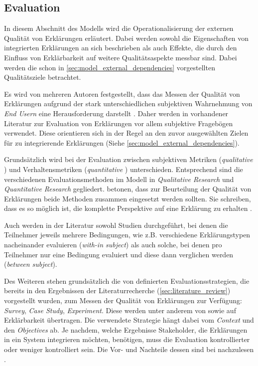 \subsection{Evaluation}
\label{sec:model_evaluation_description}

In diesem Abschnitt des Modells wird die Operationalisierung der externen Qualität von Erklärungen erläutert. Dabei werden sowohl die Eigenschaften von integrierten Erklärungen an sich beschrieben als auch Effekte, die durch den Einfluss von Erklärbarkeit auf weitere Qualitätsaspekte messbar sind. Dabei werden die schon in \autoref{sec:model_external_dependencies} vorgestellten Qualitätsziele betrachtet.

Es wird von mehreren Autoren festgestellt, dass das Messen der Qualität von Erklärungen aufgrund der stark unterschiedlichen subjektiven Wahrnehmung von \textit{End Usern}  eine Herausforderung darstellt \cite{nunes_systematic_2017, eiband_impact_2019, kouki_user_2017}. Daher werden in vorhandener Literatur zur Evaluation von Erklärungen vor allem subjektive Fragebögen verwendet. Diese orientieren sich in der Regel an den zuvor ausgewählten Zielen für zu integrierende Erklärungen (Siehe \autoref{sec:model_external_dependencies}).

Grundsätzlich wird bei der Evaluation zwischen subjektiven Metriken (\textit{qualitative} \citeauthor{wohlin2012experimentation}) und Verhaltensmetriken (\textit{quantitative} \cite{wohlin2012experimentation}) unterschieden. Entsprechend sind die verschiedenen Evaluationsmethoden im Modell in \textit{Qualitative Research} und \textit{Quantitative Research} gegliedert. \citeauthor{waa_evaluating_2021} betonen, dass zur Beurteilung der Qualität von Erklärungen beide Methoden zusammen eingesetzt werden sollten. Sie schreiben, dass es so möglich ist, die \glqq komplette Perspektive\grqq{} auf eine Erklärung zu erhalten \cite[übersetzt vgl.][]{waa_evaluating_2021}.

Auch werden in der Literatur sowohl Studien durchgeführt, bei denen die Teilnehmer jeweils mehrere Bedingungen, wie z.B. verschiedene Erklärungstypen nacheinander evaluieren (\textit{with-in subject}) als auch solche, bei denen pro Teilnehmer nur eine Bedingung evaluiert und diese dann verglichen werden (\textit{between subject}).

Des Weiteren stehen grundsätzlich die von \citeauthor{wohlin2012experimentation} definierten Evaluationsstrategien, die bereits in den Ergebnissen der Literaturrecherche (\autoref{sec:literature_review}) vorgestellt wurden, zum Messen der Qualität von Erklärungen zur Verfügung: \textit{Survey}, \textit{Case Study}, \textit{Experiment}. Diese werden unter anderem von \citeauthor{ribera2019can} sowie \citeauthor{doshi2017towards} auf Erklärbarkeit übertragen. Die verwendete Strategie hängt dabei vom \textit{Context} und den \textit{Objectives} ab. Je nachdem, welche Ergebnisse Stakeholder, die Erklärungen in ein System integrieren möchten, benötigen, muss die Evaluation kontrollierter oder weniger kontrolliert sein. Die Vor- und Nachteile dessen sind bei \citeauthor{wohlin2012experimentation} nachzulesen \cite{wohlin2012experimentation}.


